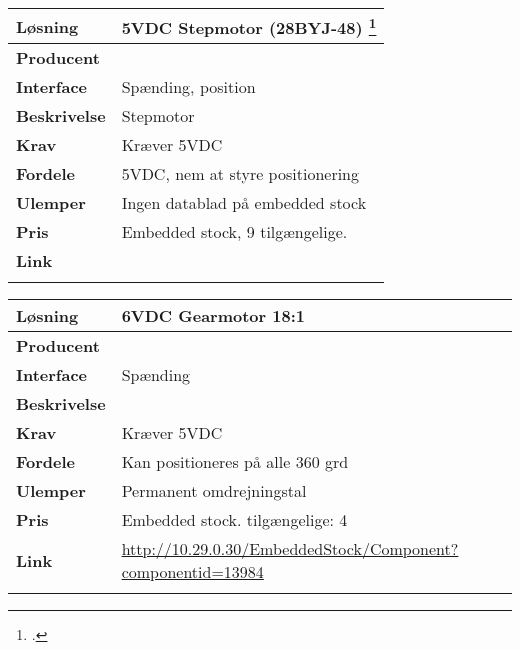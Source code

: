 \begin{table}[H] \centering
\begin{tabular}{|p{3cm}|p{11cm}|}
	\hline
	\textbf{Løsning}		
	    & 5VDC Stepmotor (28BYJ-48) \footcite{28BYJ-48-5V}
	\\ \hline
	\textbf{Producent} 		
	    & 
	\\ \hline
	\textbf{Interface} 		
	    & Spænding, position
	\\ \hline
	\textbf{Beskrivelse} 	
	    & Stepmotor
	\\ \hline
	\textbf{Krav} 			
	    & Kræver 5VDC
	\\ \hline
	\textbf{Fordele}		
	    & 5VDC, nem at styre positionering
	\\ \hline
	\textbf{Ulemper} 		
	    & Ingen datablad på embedded stock
	\\ \hline
	\textbf{Pris} 			
	    & Embedded stock, 9 tilgængelige.
	\\ \hline
	\textbf{Link} 			
	    & \url{}
	\\ \hline
	\multicolumn{2}{|c|}{} 
    \\ \hline
\end{tabular}
\end{table}

\begin{table}[H] \centering
\begin{tabular}{|p{3cm}|p{11cm}|}
	\hline
	\textbf{Løsning}		
	    & 6VDC Gearmotor 18:1
	\\ \hline
	\textbf{Producent} 		
	    & 
	\\ \hline
	\textbf{Interface} 		
	    & Spænding
	\\ \hline
	\textbf{Beskrivelse} 	
	    & 
	\\ \hline
	\textbf{Krav} 			
	    & Kræver 5VDC
	\\ \hline
	\textbf{Fordele}		
	    & Kan positioneres på alle 360 grd
	\\ \hline
	\textbf{Ulemper} 		
	    & Permanent omdrejningstal
	\\ \hline
	\textbf{Pris} 			
	    & Embedded stock. tilgængelige: 4
	\\ \hline
	\textbf{Link} 			
	    & \url{http://10.29.0.30/EmbeddedStock/Component?componentid=13984}
	\\ \hline
	\multicolumn{2}{|c|}{} 
    \\ \hline
\end{tabular}
\end{table}

